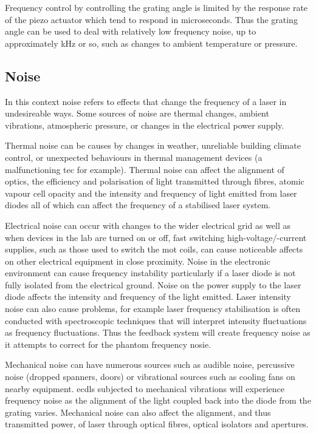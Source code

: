 Frequency control by controlling the grating angle is limited by the response rate of the piezo actuator which tend to respond in microseconds.
Thus the grating angle can be used to deal with relatively low frequency noise, up to approximately \unit[100]{kHz} or so, such as changes to ambient temperature or pressure.

\subsection{Noise}
In this context noise refers to effects that change the frequency of a laser in undesireable ways.
Some sources of noise are thermal changes, ambient vibrations, atmospheric pressure, or changes in the electrical power supply.

Thermal noise can be causes by changes in weather, unreliable building climate control, or unexpected behaviours in thermal management devices (a malfunctioning \gls{tec} for example).
Thermal noise can affect the alignment of optics, the efficiency and polarisation of light transmitted through fibres, atomic vapour cell opacity and the intensity and frequency of light emitted from laser diodes all of which can affect the frequency of a stabilised laser system.

Electrical noise can occur with changes to the wider electrical grid as well as when devices in the lab are turned on or off, fast switching high-voltage/-current supplies, such as those used to switch the \gls{mot} coils, can cause noticeable affects on other electrical equipment in close proximity.
Noise in the electronic environment can cause frequency instability particularly if a laser diode is not fully isolated from the electrical ground. Noise on the power supply to the laser diode affects the intensity and frequency of the light emitted.
Laser intensity noise can also cause problems, for example laser frequency stabilisation is often conducted with spectroscopic techniques that will interpret intensity fluctuations as frequency fluctuations. Thus the feedback system will create frequency noise as it attempts to correct for the phantom frequency nosie.

Mechanical noise can have numerous sources such as audible noise, percussive noise (dropped spanners, doors) or vibrational sources such as cooling fans on nearby equipment.
\Glspl{ecdl} subjected to mechanical vibrations will experience frequency noise as the alignment of the light coupled back into the diode from the grating varies.
Mechanical noise can also affect the alignment, and thus transmitted power, of laser through optical fibres, optical isolators and apertures.

